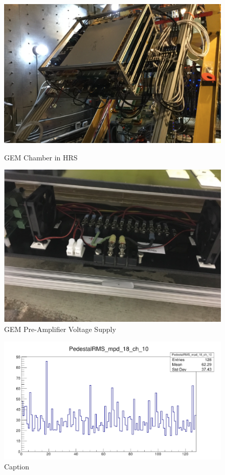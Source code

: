 \begin{figure}[!htbp]
  \centering
  \begin{minipage}[b]{0.45\textwidth}
    \includegraphics[width=\textwidth]{images/chap5/gem_in_hrs.png}
    \caption{GEM Chamber in HRS}
  \end{minipage}
  \hfill
  \begin{minipage}[b]{0.45\textwidth}
    \includegraphics[width=\textwidth]{images/chap5/gem_low_voltage.png}
    \caption{GEM Pre-Amplifier Voltage Supply}
  \end{minipage}
\end{figure}


\begin{figure}
    \centering
    \includegraphics[width=\textwidth]{images/chap5/gem_signal.png}
    \caption{Caption}
    \label{fig:apv_25_pedestal_plot}
\end{figure}


